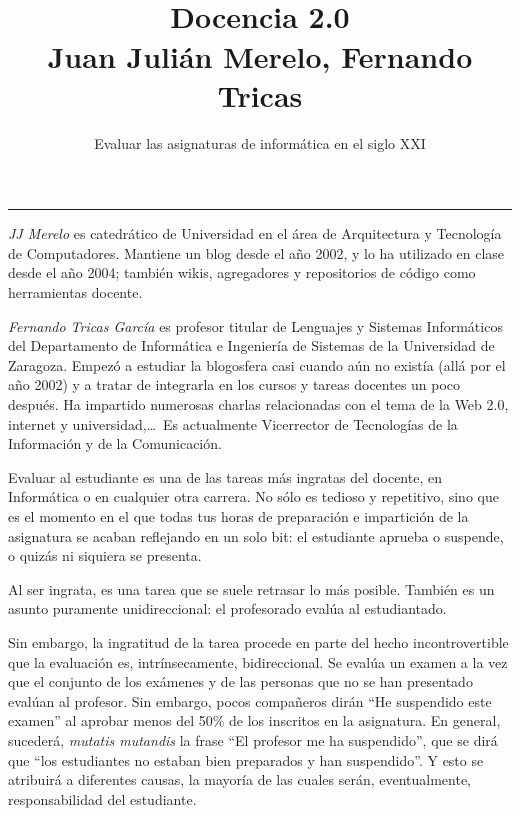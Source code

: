\documentclass[twoside,10pt]{article}
\title{\ \\ Docencia 2.0\\ \large Juan Julián Merelo, Fernando Tricas}
\author{\LARGE Evaluar las asignaturas de informática en el siglo XXI}
\date{}
\newcounter{num}
\begin{document}
\addtocounter{page}{2}

\maketitle
\vspace*{-5ex}

\begin{multicols}{2}


\noindent\rule{86mm}{1pt}
\vspace{1ex} {\small{\begin{window} 
\noindent\emph{JJ Merelo} es catedrático de Universidad
en el área de Arquitectura y Tecnología de Computadores.
Mantiene un blog desde el año 2002, y lo ha utilizado en clase desde
el año 2004; también wikis, agregadores y repositorios de código
como herramientas docente. 
\end{window}}}

\medskip

{\small{\begin{window}
		\noindent \emph{Fernando Tricas García} es profesor
		titular de Lenguajes y Sistemas Informáticos del Departamento
		de Informática e Ingeniería de Sistemas de la Universidad de
		Zaragoza.  Empezó a estudiar la blogosfera casi cuando aún no
		existía (allá por el año 2002) y a tratar de integrarla en los
		cursos y tareas docentes un poco después.  Ha impartido
		numerosas charlas relacionadas con el tema de la Web 2.0, 
		internet y universidad,\ldots\ 
		Es actualmente Vicerrector de Tecnologías de la Información y
de la Comunicación.   
		\end{window}}}

Evaluar al estudiante es una de las tareas más ingratas del docente,
en Informática o en cualquier otra carrera. No sólo es tedioso y
repetitivo, sino que es el momento en el que todas tus horas de
preparación e impartición de la asignatura se acaban reflejando en un
solo bit: el estudiante aprueba o suspende, o quizás ni siquiera se
presenta.

Al ser ingrata, es una tarea que se suele retrasar lo más
posible. También es un asunto puramente unidireccional: el profesorado
evalúa al estudiantado.

Sin embargo, la ingratitud de la tarea procede en parte del hecho
incontrovertible que la evaluación es, intrínsecamente,
bidireccional. Se evalúa un examen a la vez que el conjunto de los
exámenes y de las personas que no se han presentado evalúan al
profesor. Sin embargo, pocos compañeros dirán ``He suspendido este
examen'' al aprobar menos del 50\% de los inscritos en la
asignatura. En general, sucederá, {\em mutatis mutandis} la frase ``El
profesor me ha suspendido'', que se dirá que ``los estudiantes no
estaban bien preparados y han suspendido''. Y esto se atribuirá a
diferentes causas, la mayoría de las cuales serán, eventualmente,
responsabilidad del estudiante.


\end{multicols}
\end{document}
